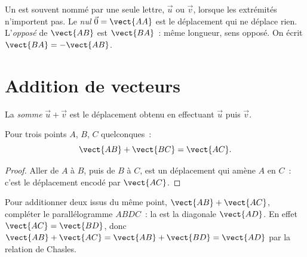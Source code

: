 \begin{notation}
Un  est souvent nommé par une seule lettre, $\vec u$ ou $\vec v$,
lorsque les extrémités n'importent pas. Le \emph{ nul}
$\vec 0 = \vect{AA}$ est le déplacement qui ne déplace rien.
L'\emph{opposé} de $\vect{AB}$ est $\vect{BA}$~: même longueur, sens
opposé. On écrit $\vect{BA} = -\vect{AB}$.
\end{notation}

\section{Addition de vecteurs}

\begin{definition}\label{def:g10:vectors:sum}
La \emph{somme} $\vec u + \vec v$ est le
déplacement obtenu en effectuant $\vec u$ puis $\vec v$.
\end{definition}

\begin{theorem}\label{thm:g10:vectors:chasles}
Pour trois points $A$, $B$, $C$ quelconques~:
\[
\vect{AB} + \vect{BC} = \vect{AC}.
\]
\end{theorem}

\begin{proof}
Aller de $A$ à $B$, puis de $B$ à $C$, est un déplacement qui amène $A$
en $C$~: c'est le déplacement encodé par $\vect{AC}$.
\end{proof}

\begin{remark}
Pour additionner deux  issus du même point, $\vect{AB} +
\vect{AC}$, compléter le parallélogramme $ABDC$~: la  est la
diagonale $\vect{AD}$. En effet $\vect{AC} = \vect{BD}$, donc
$\vect{AB} + \vect{AC} = \vect{AB} + \vect{BD} = \vect{AD}$ par la
relation de Chasles.
\end{remark}

